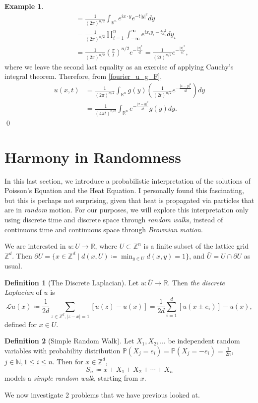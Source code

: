 \documentclass[openany, amssymb, psamsfonts]{amsart}
\theoremstyle{definition}
\newtheorem{defn}{Definition}[section]
\newtheorem{exmp}{Example}[section]
\numberwithin{equation}{section}
\newcommand{\bbn}{\mathbb{N}}
\newcommand{\bbr}{\mathbb{R}}
\newcommand{\bbz}{\mathbb{Z}}
\newcommand{\bbp}{\mathbb{P}}
\newcommand{\call}{\mathcal{L}}
\begin{document}
\begin{exmp}
\begin{align*}
        &= \frac{1}{(2\pi)^{n/2}}\int_{\bbr^n} e^{ix \cdot y} e^{-t|y|^2} dy \\
        &= \frac{1}{(2\pi)^{n/2}}\prod_{i=1}^{n}\int_{-\infty}^{\infty}e^{ix_i y_i - t y_i^2}dy_i \\
        &= \frac{1}{(2\pi)^{n/2}} \left(\frac{\pi}{t}\right)^{n/2} e^{-\frac{|x|^2}{4t}} = \frac{1}{(2t)^{n/2}}e^{-\frac{|x|^2}{4t}},
    \end{align*}
    where we leave the second last equality as an exercise of applying Cauchy's integral theorem. Therefore, from \eqref{fourier_u_g_F},
    \begin{align*}
        u(x, t) &= \frac{1}{(2\pi)^{n/2}}\int_{\bbr^n} g(y) \left(\frac{1}{(2t)^{n/2}} e^{-\frac{|x-y|^2}{4t}}\right) dy \nonumber \\
        &= \frac{1}{(4 \pi t)^{n/2}} \int_{\bbr^n}e^{-\frac{|x-y|^2}{4t}} g(y) dy .
    \end{align*} \qed
\end{exmp}
\section{Harmony in Randomness}
In this last section, we introduce a probabilistic interpretation of the solutions of Poisson's Equation and the Heat Equation. I personally found this fascinating, but this is perhaps not surprising, given that heat is propagated via particles that are in \textit{random} motion. For our purposes, we will explore this interpretation only using discrete time and discrete space through \textit{random walks}, instead of continuous time and continuous space through \textit{Brownian motion}.

We are interested in $u: U \to \bbr$, where $U \subset \bbz^n$ is a finite subset of the lattice grid $\bbz^d$. Then $\partial U = \{x \in \bbz^d \mid d(x, U) \coloneqq \min_{y \in U}d(x, y) = 1\}$, and $\bar{U} = U \cap \partial U$ as usual.
\begin{defn} [The Discrete Laplacian]
Let $u: \bar{U} \to \bbr$. Then \textit{the discrete Laplacian} of $u$ is
\begin{equation}
    \call u(x) \coloneqq \frac{1}{2d} \sum_{z \in \bbz^d, |z - x| = 1} [u(z) - u(x)] =  \frac{1}{2d} \sum_{i=1}^{d} [u(x \pm e_i)] - u(x) ,
\end{equation}
defined for $x \in U$.
\end{defn}
\begin{defn} [Simple Random Walk]
Let $X_1, X_2, \dots$ be independent random variables with probability distribution $\bbp(X_j = e_i) = \bbp(X_j = - e_i) = \frac{1}{2n}$, $j \in \bbn, 1 \leq i \leq n$. Then for $x \in \bbz^d$, \[
S_n \coloneqq x + X_1 + X_2 + \cdots + X_n
\]
models a \textit{simple random walk}, starting from $x$.
\end{defn}
We now investigate 2 problems that we have previous looked at.
\end{document}
